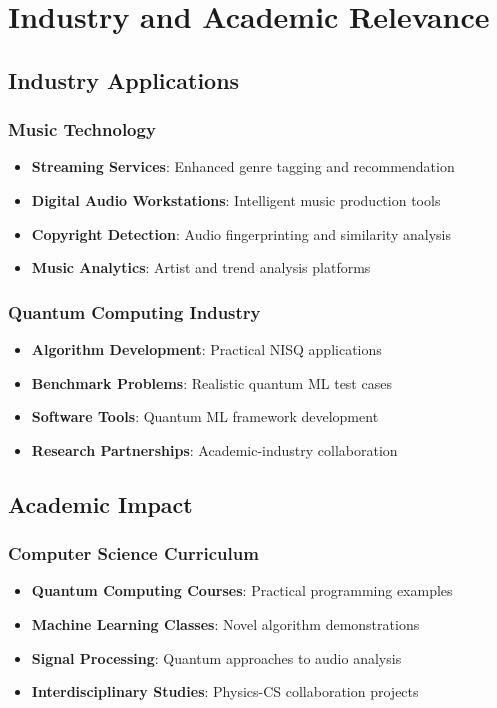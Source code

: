 \documentclass[11pt,a4paper]{article}
\begin{document}
\section{Industry and Academic Relevance}

\subsection{Industry Applications}

\subsubsection{Music Technology}
\begin{itemize}
    \item \textbf{Streaming Services}: Enhanced genre tagging and recommendation
    \item \textbf{Digital Audio Workstations}: Intelligent music production tools
    \item \textbf{Copyright Detection}: Audio fingerprinting and similarity analysis
    \item \textbf{Music Analytics}: Artist and trend analysis platforms
\end{itemize}

\subsubsection{Quantum Computing Industry}
\begin{itemize}
    \item \textbf{Algorithm Development}: Practical NISQ applications
    \item \textbf{Benchmark Problems}: Realistic quantum ML test cases
    \item \textbf{Software Tools}: Quantum ML framework development
    \item \textbf{Research Partnerships}: Academic-industry collaboration
\end{itemize}

\subsection{Academic Impact}

\subsubsection{Computer Science Curriculum}
\begin{itemize}
    \item \textbf{Quantum Computing Courses}: Practical programming examples
    \item \textbf{Machine Learning Classes}: Novel algorithm demonstrations
    \item \textbf{Signal Processing}: Quantum approaches to audio analysis
    \item \textbf{Interdisciplinary Studies}: Physics-CS collaboration projects
\end{itemize}
\end{document}
